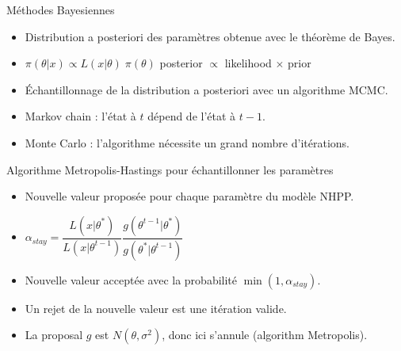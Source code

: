 \documentclass[aspectratio=169]{beamer}
\begin{document}
\begin{frame}{Méthodes Bayesiennes}
	\begin{itemize}
	\setlength{\itemsep}{17pt}
	\item Distribution a posteriori des paramètres obtenue avec le théorème de Bayes.
	\item $\pi(\theta|x) \propto L(x|\theta) \; \pi(\theta)$
	\hspace{3cm}
	posterior $\propto$ likelihood $\times$ prior
	\item Échantillonnage de la distribution a posteriori avec un algorithme MCMC.
	\item Markov chain : l'état à $t$ dépend de l'état à $t-1$.
	\item Monte Carlo : l'algorithme nécessite un grand nombre d'itérations.
	\end{itemize}
\end{frame}


\begin{frame}{Algorithme Metropolis-Hastings pour échantillonner les paramètres}
	\begin{itemize}
	\setlength{\itemsep}{17pt}
	\item Nouvelle valeur proposée pour chaque paramètre du modèle NHPP.
	\item $\alpha_{stay} = \dfrac{L(x|\theta^*)}{L(x|\theta^{t-1})} \dfrac{g(\theta^{t-1}|\theta^*)}{g(\theta^*|\theta^{t-1})}$
	\item Nouvelle valeur acceptée avec la probabilité $\min(1, \alpha_{stay})$.
	\item Un rejet de la nouvelle valeur est une itération valide.
	\item La proposal $g$ est $N(\theta, \sigma^2)$, donc ici s'annule (algorithm Metropolis).
	\end{itemize}
	\vspace{0.4cm}
	{\scriptsize
	}
\end{frame}
\end{document}
